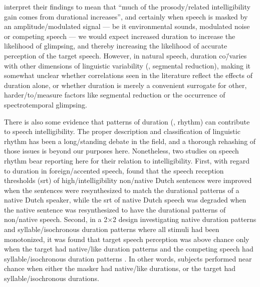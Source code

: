 \citeauthor*{MayoEtAl2012} interpret their findings to mean that “much of the prosody\-/related intelligibility gain comes from durational increases”, and certainly when speech is masked by an amplitude\-/modulated signal — be it environmental sounds, modulated noise or competing speech — we would expect increased duration to increase the likelihood of glimpsing, and thereby increasing the likelihood of accurate perception of the target speech.  However, in natural speech, duration co\=/varies with other dimensions of linguistic variability (\eg, segmental reduction), making it somewhat unclear whether correlations seen in the literature reflect the effects of duration alone, or whether duration is merely a convenient surrogate for other, harder\-/to\-/measure factors like segmental reduction or the occurrence of spectrotemporal glimpsing.

There is also some evidence that patterns of duration (\ie, rhythm) can contribute to speech intelligibility.  The proper description and classification of linguistic rhythm has been a long\-/standing debate in the field, and a thorough rehashing of those issues is beyond our purposes here.\footnotemark{}  Nonetheless, two studies on speech rhythm bear reporting here for their relation to intelligibility.  First, with regard to duration in foreign\-/accented speech, \citet{QueneVanDelft2010} found that the speech reception thresholds (\ac{srt}) of high\-/intelligibility non\-/native Dutch sentences were improved when the sentences were resynthesized to match the durational patterns of a native Dutch speaker, while the \ac{srt} of native Dutch speech was degraded when the native sentence was resynthesized to have the durational patterns of non\-/native speech.  Second, in a 2×2 design investigating native duration patterns and syllable\-/isochronous duration patterns where all stimuli had been monotonized, it was found that target speech perception was above chance only when the target had native\-/like duration patterns and the competing speech had syllable\-/isochronous duration patterns \citep{CushingDellwo2010}.  In other words, subjects performed near chance when either the masker had native\-/like durations, or the target had syllable\-/isochronous durations.  

